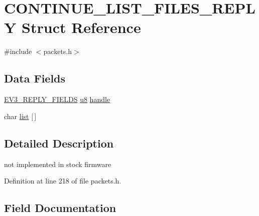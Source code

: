 \hypertarget{struct_c_o_n_t_i_n_u_e___l_i_s_t___f_i_l_e_s___r_e_p_l_y}{}\section{C\+O\+N\+T\+I\+N\+U\+E\+\_\+\+L\+I\+S\+T\+\_\+\+F\+I\+L\+E\+S\+\_\+\+R\+E\+P\+L\+Y Struct Reference}
\label{struct_c_o_n_t_i_n_u_e___l_i_s_t___f_i_l_e_s___r_e_p_l_y}


{\ttfamily \#include $<$packets.\+h$>$}

\subsection*{Data Fields}
\begin{DoxyCompactItemize}
\item 
\hyperlink{packets_8h_a382c165d520d462ac8f0c88e2a1970cb}{E\+V3\+\_\+\+R\+E\+P\+L\+Y\+\_\+\+F\+I\+E\+L\+D\+S} \hyperlink{defs_8h_a92c50087ca0e64fa93fc59402c55f8ca}{u8} \hyperlink{struct_c_o_n_t_i_n_u_e___l_i_s_t___f_i_l_e_s___r_e_p_l_y_a2f1e90eb35c05582c8b60d001920036a}{handle}
\item 
char \hyperlink{struct_c_o_n_t_i_n_u_e___l_i_s_t___f_i_l_e_s___r_e_p_l_y_aff445b895fa0846e460f0c83e186647d}{list} \mbox{[}$\,$\mbox{]}
\end{DoxyCompactItemize}


\subsection{Detailed Description}
not implemented in stock firmware 

Definition at line 218 of file packets.\+h.



\subsection{Field Documentation}
\hypertarget{struct_c_o_n_t_i_n_u_e___l_i_s_t___f_i_l_e_s___r_e_p_l_y_a2f1e90eb35c05582c8b60d001920036a}{}
